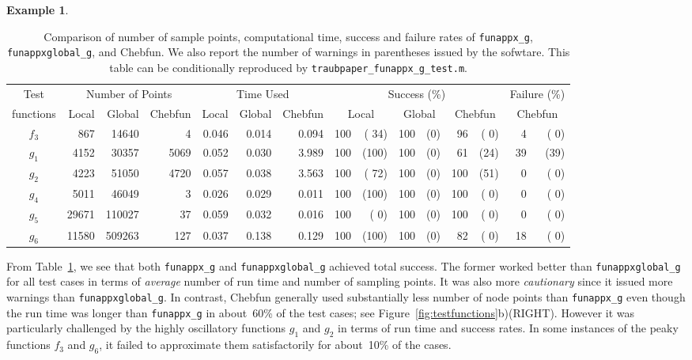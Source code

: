 \documentclass[review]{elsarticle}
\theoremstyle{definition}
\newtheorem{exmp}{Example}
\newcommand{\funappxg}{\texttt{funappx\_g\xspace}}
\newcommand{\funappxglobalg}{\texttt{funappxglobal\_g\xspace}}
\begin{document}
\begin{exmp}
%
\begin{table}[bth]
\centering
\caption{Comparison of number of sample points, computational time, success and
failure rates of \funappxg, \funappxglobalg, and
Chebfun. We also report the number of warnings in parentheses issued by the
sofwtare. This table can be conditionally reproduced by
\texttt{traubpaper\_funappx\_g\_test.m}.}
\label{tab:localVsGlobalVsChebfun}
{\footnotesize
\setlength{\tabcolsep}{.13em} %
\begin{tabular}{|c|rrr|rrr|rrrrrr|rr|}
\hline
    Test      &     \multicolumn{3}{c|}{Number of Points} & \multicolumn{3}{c|}{Time Used}  & \multicolumn{6}{|c|}{Success (\%)} &  \multicolumn{2}{c|}{Failure (\%)}
\\  functions &  Local  &  Global    &  Chebfun & Local       &  Global  & Chebfun              & \multicolumn{2}{c}{Local}   &  \multicolumn{2}{c}{Global}  & \multicolumn{2}{c}{Chebfun}  & \multicolumn{2}{|c|}{Chebfun}  
\\ \hline
      $f_3$ &    867  &   14640  &    4   &   0.046   &  0.014  &  0.094  &    100  & ( 34) &  100  &  (0) &     96 &   ( 0)  &     4  &  ( 0) 
\\    $g_1$ &   4152  &   30357  & 5069   &   0.052   &  0.030  &  3.989  &    100  & (100) &  100  &  (0) &     61 &   (24)  &    39  &  (39) 
\\    $g_2$ &   4223  &   51050  & 4720   &   0.057   &  0.038  &  3.563  &    100  & ( 72) &  100  &  (0) &    100 &   (51)  &     0  &  ( 0) 
\\    $g_4$ &   5011  &   46049  &    3   &   0.026   &  0.029  &  0.011  &    100  & (100) &  100  &  (0) &    100 &   ( 0)  &     0  &  ( 0) 
\\    $g_5$ &  29671  &  110027  &   37   &   0.059   &  0.032  &  0.016  &    100  & (  0) &  100  &  (0) &    100 &   ( 0)  &     0  &  ( 0) 
\\    $g_6$ &  11580  &  509263  &  127   &   0.037   &  0.138  &  0.129  &    100  & (100) &  100  &  (0) &     82 &   ( 0)  &    18  &  ( 0) 
\\ \hline
\end{tabular}
}
\end{table}
%

From Table~\ref{tab:localVsGlobalVsChebfun}, we see that both \funappxg{} and
\funappxglobalg{} achieved total success. The former worked better than
\funappxglobalg{} for all test cases in terms of \emph{average} number of run
time and number of sampling points. It was also more \emph{cautionary} since it
issued more warnings than \funappxglobalg.
%
In contrast, Chebfun generally used substantially less number of node points
than \funappxg{} even though the run time was longer than \funappxg{} in about~60\% of the
test cases; see Figure~\ref{fig:testfunctions}b)(RIGHT). However it was
particularly challenged by the highly oscillatory functions $g_1$ and $g_2$ in
terms of run time and success rates. In some instances of the peaky functions
$f_3$ and $g_6$, it failed to approximate them satisfactorily for about~10\% of
the cases.
\end{exmp} 
\end{document}
